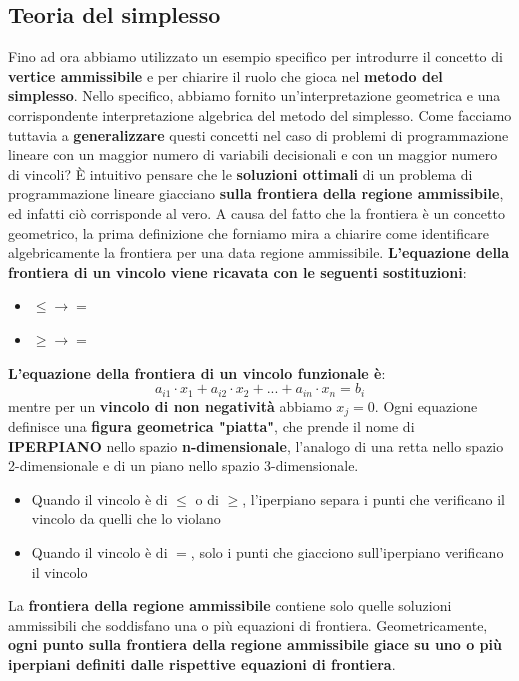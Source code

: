 \documentclass[12pt]{article}
\begin{document}
\subsection{Teoria del simplesso}
Fino ad ora abbiamo utilizzato un esempio specifico per introdurre il concetto di \textbf{vertice ammissibile} e per chiarire il ruolo che gioca
nel \textbf{metodo del simplesso}. Nello specifico, abbiamo fornito un'interpretazione geometrica e una corrispondente interpretazione algebrica del metodo del simplesso.
Come facciamo tuttavia a \textbf{generalizzare} questi concetti nel caso di problemi di programmazione lineare con un maggior numero di variabili decisionali e con un maggior numero di vincoli?
È intuitivo pensare che le \textbf{soluzioni ottimali} di un problema di programmazione lineare giacciano \textbf{sulla frontiera della regione ammissibile}, ed infatti ciò corrisponde al vero.
A causa del fatto che la frontiera è un concetto geometrico, la prima definizione che forniamo mira a chiarire come identificare algebricamente la frontiera per una data regione ammissibile.
\textbf{L'equazione della frontiera di un vincolo viene ricavata con le seguenti sostituzioni}:
\begin{itemize}
    \item $\leq \rightarrow =$
    \item $\geq \rightarrow =$ 
\end{itemize}
\textbf{L'equazione della frontiera di un vincolo funzionale è}:
$$a_{i1} \cdot x_1 + a_{i2} \cdot x_2 + ... + a_{in} \cdot x_n = b_i$$
mentre per un \textbf{vincolo di non negatività} abbiamo $x_j = 0$.
Ogni equazione definisce una \textbf{figura geometrica "piatta"}, che prende il nome di \textbf{IPERPIANO} nello spazio \textbf{n-dimensionale}, l'analogo di una retta nello spazio
2-dimensionale e di un piano nello spazio 3-dimensionale.
\begin{itemize}
    \item Quando il vincolo è di $\leq$ o di $\geq$, l'iperpiano separa i punti che verificano il vincolo da quelli che lo violano
    \item Quando il vincolo è di $=$, solo i punti che giacciono sull'iperpiano verificano il vincolo
\end{itemize}
La \textbf{frontiera della regione ammissibile} contiene solo quelle soluzioni ammissibili che soddisfano una o più equazioni di frontiera.
Geometricamente, \textbf{ogni punto sulla frontiera della regione ammissibile giace su uno o più iperpiani definiti dalle rispettive equazioni di frontiera}.
\end{document}

